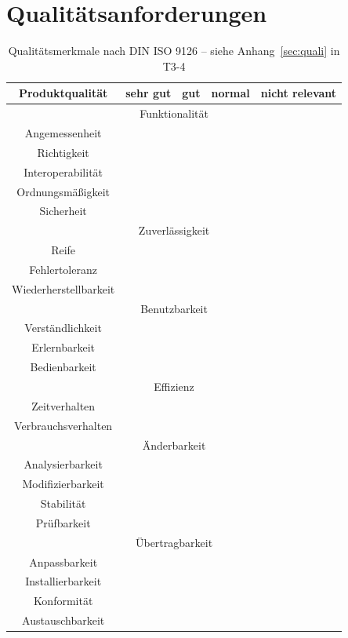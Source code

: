 	\section{Qualitätsanforderungen}
	\begin{table}[ht]
	\caption{Qualitätsmerkmale nach DIN ISO 9126 – siehe Anhang~\ref{sec:quali} in T3-4}
	\centering
		\begin{tabular}{|c|c|c|c|c|}
		\hline Produktqualität & sehr gut & gut & normal & nicht relevant \\ 
		\hline \multicolumn{5}{|c|}{Funktionalität}   \\ 
		\hline Angemessenheit &  &  & \checkmark &  \\ 
		\hline Richtigkeit &  & \checkmark  &  &  \\ 
		\hline Interoperabilität &  &  &\checkmark  &  \\ 
		\hline Ordnungsmäßigkeit &  &  &\checkmark  &  \\ 
		\hline Sicherheit & & \checkmark & &  \\ 
		\hline \multicolumn{5}{|c|}{Zuverlässigkeit}   \\ 
		\hline Reife &  &   & \checkmark &  \\ 
		\hline Fehlertoleranz &  &  \checkmark &  &  \\ 
		\hline Wiederherstellbarkeit & \checkmark  &  &  &  \\ 
		\hline \multicolumn{5}{|c|}{Benutzbarkeit}  \\ 
		\hline Verständlichkeit &  &  & \checkmark  &  \\ 
		\hline Erlernbarkeit &  &   &  &\checkmark  \\ 
		\hline Bedienbarkeit &  &   & \checkmark &  \\ 
		\hline \multicolumn{5}{|c|}{Effizienz} \\ 
		\hline Zeitverhalten &  &  &\checkmark   &  \\ 
		\hline Verbrauchsverhalten &  &  &\checkmark   &  \\ 
		\hline \multicolumn{5}{|c|}{Änderbarkeit} \\ 
		\hline Analysierbarkeit &  &   & \checkmark &  \\ 
		\hline Modifizierbarkeit &  &  &  \checkmark  &  \\ 
		\hline Stabilität &  &  & \checkmark &  \\ 
		\hline Prüfbarkeit &   &  &\checkmark  &  \\ 
		\hline \multicolumn{5}{|c|}{Übertragbarkeit}  \\ 
		\hline Anpassbarkeit &  &  &\checkmark  &  \\ 
		\hline Installierbarkeit &  &  &  \checkmark &  \\ 
		\hline Konformität	 &  &  &\checkmark   &  \\ 
		\hline Austauschbarkeit &  &  &   & \checkmark \\ 
		\hline 
		\end{tabular} 
	\label{tab:quali_anf}
	\end{table}
	
